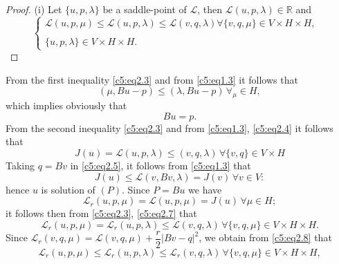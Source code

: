 \begin{proof}
(i) Let $\{u, p, \lambda \}$ be a saddle-point of $\mathscr{L}$, then 
$\mathscr{L}(u, p, \lambda)  \in \mathbb{R}$ and 
\begin{equation}
\begin{cases}
\mathscr{L} (u, p, \mu) \leq \mathscr{L} (u, p, \lambda) \leq
\mathscr{L} (v, q, \lambda)  
\forall \{v, q, \mu \} \in V \times H \times H,\\
& \\
\{u, p, \lambda \} \in V \times H \times H.\tag{2.3}\label{c5:eq2.3}
\end{cases}
\end{equation}
\end{proof}
From the first inequality \eqref{c5:eq2.3} and from \eqref{c5:eq1.3}
it follows that  
$$
(\mu, Bu-p) \leq (\lambda, Bu-p)\, \forall _\mu \in H,
$$
which implies obviously that 
\begin{equation}
Bu = p. \tag{2.4}\label{c5:eq2.4}
\end{equation}\pageoriginale 
From the second inequality \eqref{c5:eq2.3} and from \eqref{c5:eq1.3}, \eqref{c5:eq2.4} it follows that 
\begin{equation}
J(u) = \mathscr{L} (u, p, \lambda) \leq (v, q, \lambda)\, \forall \{v, q \} \in V \times H\tag{2.5}\label{c5:eq2.5}
\end{equation}
Taking $q = Bv$ in \eqref{c5:eq2.5}, it follows from \eqref{c5:eq1.3} that 
\begin{equation}
J (u) \leq \mathscr{L} (v, Bv, \lambda) = J (v)\, \forall v \in V : \tag{2.6}\label{c5:eq2.6}
\end{equation}
hence $u$ is solution of $(P)$. Since $P = Bu$ we have 
\begin{equation}
\mathscr{L}_r (u, p, \mu) = \mathscr{L} (u, p, \mu) = J (u)\, \forall \mu \in H;  \tag{2.7}\label{c5:eq2.7}
\end{equation}
it follows then from \eqref{c5:eq2.3}, \eqref{c5:eq2.7} that 
\begin{equation}
\mathscr{L}_r (u, p, \mu) = \mathscr{L}_r (u, p, \lambda) \leq \mathscr{L} (v, q, \lambda)\, \forall \{v, q, \mu \} \in V \times H \times H. \tag{2.8}\label{c5:eq2.8}
\end{equation}
Since $\mathscr{L}_r (v, q, \mu)  = \mathscr{L} (v, q, \mu) + \dfrac{r}{2} |Bv-q|^2$, we obtain from \eqref{c5:eq2.8} that 
\begin{equation}
\mathscr{L}_r (u, p, \mu) \leq \mathscr{L}_r (u, p, \lambda) \leq \mathscr{L}_r (v, q, \lambda)\, \forall \{v, q, \mu \} \in V \times H \times H, \tag{2.9}\label{c5:eq2.9}
\end{equation}
